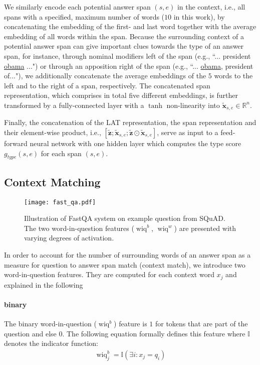 \documentclass[11pt,a4paper]{article}
\begin{document}
We similarly encode each potential answer span $(s,e)$ in the context, i.e., all spans with a specified, maximum number of words ($10$ in this work), by concatenating the embedding of the first- and last word together with the average embedding of all words within the span. Because the surrounding context of a potential answer span can give important clues towards the type of an answer span, for instance, through nominal modifiers left of the span (e.g., ``... president \underline{obama} ...") or through an apposition right of the span (e.g., ``... \underline{obama}, president of..."), we additionally concatenate the average embeddings of the $5$ words to the left and to the right of a span, respectively. The concatenated span representation, which comprises in total five different embeddings, is further transformed by a fully-connected layer with a $\tanh$ non-linearity into $\boldsymbol{\tilde{x}}_{s,e} \in \mathbb{R}^n$.

Finally, the concatenation of the LAT representation, the span representation and their element-wise product, i.e., $[\boldsymbol{\tilde{z}};\boldsymbol{\tilde{x}}_{s,e};\boldsymbol{\tilde{z}} \odot \boldsymbol{\tilde{x}}_{s,e}]$, serve as input to a feed-forward neural network with one hidden layer which computes the type score $g_{type}(s,e)$ for each span $(s,e)$.

\subsection{Context Matching}\label{sec:features}

\begin{figure*}[th]
    \centering
    \texttt{[image: fast\_qa.pdf]}
    \caption{Illustration of FastQA system on example question from SQuAD. The two word-in-question features ($\operatorname{wiq}^b$, $\operatorname{wiq}^w$) are presented with varying degrees of activation.}
    \label{fig:fast_qa}
\end{figure*}

In order to account for the number of surrounding words of an answer span as a measure for question to answer span match (context match), we introduce two word-in-question features. They are computed for each context word $x_j$ and explained in the following

\paragraph{binary} The binary word-in-question ($\operatorname{wiq}^b$) feature is $1$ for tokens that are part of the question and else $0$. The following equation formally defines this feature where $\mathbb{I}$ denotes the indicator function:
\begin{align}
    \operatorname{wiq}^b_j = \mathbb{I}(\exists i: x_j = q_i )
\end{align}
\end{document}

